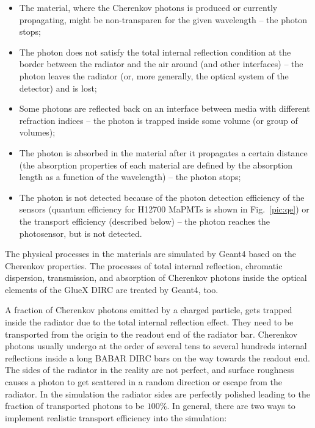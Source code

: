 \begin{itemize}
\item The material, where the Cherenkov photons is produced or currently propagating, might be non-transparen for the given wavelength -- the photon stops;
\item The photon does not satisfy the total internal reflection condition at the border between the radiator and the air around (and other interfaces) -- the photon leaves the radiator (or, more generally, the optical system of the detector) and is lost;
\item Some photons are reflected back on an interface between media with different refraction indices -- the photon is trapped inside some volume (or group of volumes);
\item The photon is absorbed in the material after it propagates a certain distance (the absorption properties of each material are defined by the absorption length as a function of the wavelength) -- the photon stops;
\item The photon is not detected because of the photon detection efficiency of the sensors (quantum efficiency for H12700 MaPMTs is shown in Fig.~\ref{pic:qe}) or the transport efficiency (described below)  -- the photon reaches the photosensor, but is not detected.
\end{itemize}

The physical processes in the materials are simulated by Geant4 based on the Cherenkov properties. The processes of total internal reflection, chromatic dispersion, transmission, and absorption of Cherenkov photons inside the optical elements of the GlueX DIRC are treated by Geant4, too.

A fraction of Cherenkov photons emitted by a charged particle, gets trapped inside the radiator due to the total internal reflection effect. They need to be transported from the origin to the readout end of the radiator bar. Cherenkov photons usually undergo at the order of several tens to several hundreds internal reflections inside a long BABAR DIRC bars on the way towards the readout end. The sides of the radiator in the reality are not perfect, and surface roughness causes a photon to get scattered in a random direction or escape from the radiator. In the simulation the radiator sides are perfectly polished leading to the fraction of transported photons to be $100\%$. In general, there are two ways to implement realistic transport efficiency into the simulation:

